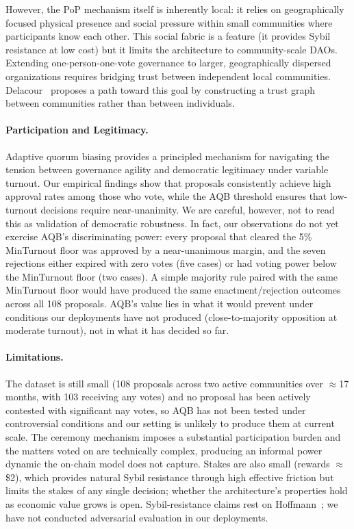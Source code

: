 \documentclass{svproc}
\begin{document}
However, the PoP mechanism itself is inherently local: it relies on geographically focused physical presence and social pressure within small communities where participants know each other. This social fabric is a feature (it provides Sybil resistance at low cost) but it limits the architecture to community-scale DAOs. Extending one-person-one-vote governance to larger, geographically dispersed organizations requires bridging trust between independent local communities. Delacour~\cite{delacour2023global} proposes a path toward this goal by constructing a trust graph between communities rather than between individuals.

\paragraph{Participation and Legitimacy.}
Adaptive quorum biasing provides a principled mechanism for navigating the tension between governance agility and democratic legitimacy under variable turnout. Our empirical findings show that proposals consistently achieve high approval rates among those who vote, while the AQB threshold ensures that low-turnout decisions require near-unanimity. We are careful, however, not to read this as validation of democratic robustness. In fact, our observations do not yet exercise AQB's discriminating power: every proposal that cleared the 5\% MinTurnout floor was approved by a near-unanimous margin, and the seven rejections either expired with zero votes (five cases) or had voting power below the MinTurnout floor (two cases). A simple majority rule paired with the same MinTurnout floor would have produced the same enactment/rejection outcomes across all 108 proposals. AQB's value lies in what it would prevent under conditions our deployments have not produced (close-to-majority opposition at moderate turnout), not in what it has decided so far.

\paragraph{Limitations.}
The dataset is still small (108 proposals across two active communities over $\approx$17 months, with 103 receiving any votes) and no proposal has been actively contested with significant nay votes, so AQB has not been tested under controversial conditions and our setting is unlikely to produce them at current scale. The ceremony mechanism imposes a substantial participation burden and the matters voted on are technically complex, producing an informal power dynamic the on-chain model does not capture. Stakes are also small (rewards $\approx$\$2), which provides natural Sybil resistance through high effective friction but limits the stakes of any single decision; whether the architecture's properties hold as economic value grows is open. Sybil-resistance claims rest on Hoffmann~\cite{hoffmann2021security}; we have not conducted adversarial evaluation in our deployments.
\end{document}
